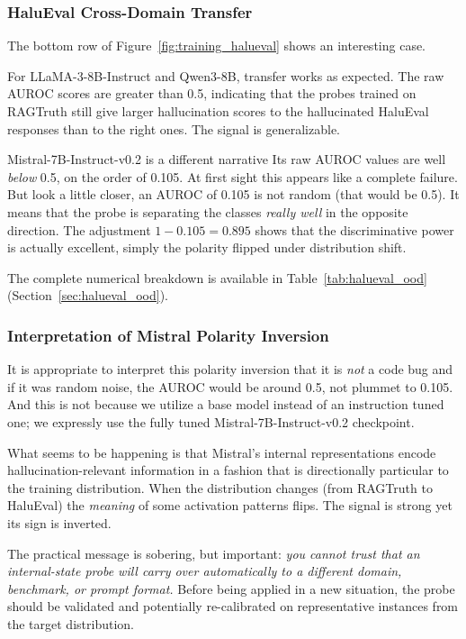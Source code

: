 \subsubsection{HaluEval Cross-Domain Transfer}
\label{sec:halueval_transfer}

The bottom row of Figure~\ref{fig:training_halueval} shows an interesting case.

For LLaMA-3-8B-Instruct and Qwen3-8B, transfer works as expected. The raw AUROC scores are greater than 0.5, indicating that the probes trained on RAGTruth still give larger hallucination scores to the hallucinated HaluEval responses than to the right ones. The signal is generalizable.

Mistral-7B-Instruct-v0.2 is a different narrative Its raw AUROC values are well \emph{below} 0.5, on the order of 0.105. At first sight this appears like a complete failure. But look a little closer, an AUROC of 0.105 is not random (that would be 0.5). It means that the probe is separating the classes \emph{really well} in the opposite direction. The adjustment $1 - 0.105 = 0.895$ shows that the discriminative power is actually excellent, simply the polarity flipped under distribution shift.

The complete numerical breakdown is available in Table~\ref{tab:halueval_ood} (Section~\ref{sec:halueval_ood}). 

\subsubsection{Interpretation of Mistral Polarity Inversion}
\label{sec:polarity_inversion}

It is appropriate to interpret this polarity inversion that it is \emph{not} a code bug and if it was random noise, the AUROC would be around 0.5, not plummet to 0.105. And this is not because we utilize a base model instead of an instruction tuned one; we expressly use the fully tuned Mistral-7B-Instruct-v0.2 checkpoint.

What seems to be happening is that Mistral's internal representations encode hallucination-relevant information in a fashion that is directionally particular to the training distribution. When the distribution changes (from RAGTruth to HaluEval) the \emph{meaning} of some activation patterns flips. The signal is strong yet its sign is inverted.

The practical message is sobering, but important: \emph{you cannot trust that an internal-state probe will carry over automatically to a different domain, benchmark, or prompt format.} Before being applied in a new situation, the probe should be validated and potentially re-calibrated on representative instances from the target distribution.

